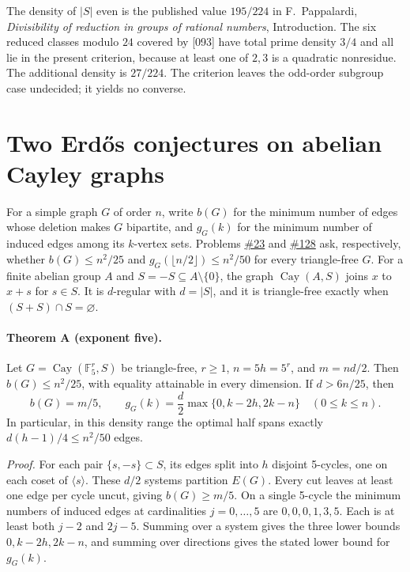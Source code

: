 \documentclass[11pt]{article}
\begin{document}
The density of $|S|$ even is the published value $195/224$ in
F.~Pappalardi, \emph{Divisibility of reduction in groups of rational
numbers}, Introduction. The six reduced classes modulo $24$ covered by
[093] have total prime density $3/4$ and all lie in the present criterion,
because at least one of $2,3$ is a quadratic nonresidue. The additional
density is $27/224$. The criterion leaves the odd-order subgroup case
undecided; it yields no converse.



\section{Two Erd\H{o}s conjectures on abelian Cayley graphs}
For a simple graph $G$ of order $n$, write $b(G)$ for the minimum number of
edges whose deletion makes $G$ bipartite, and $g_G(k)$ for the minimum
number of induced edges among its $k$-vertex sets. Problems
\href{https://www.erdosproblems.com/23}{\#23} and
\href{https://www.erdosproblems.com/128}{\#128} ask, respectively, whether
$b(G)\le n^2/25$ and $g_G(\lfloor n/2\rfloor)\le n^2/50$ for every
triangle-free $G$. For a finite abelian group $A$ and
$S=-S\subseteq A\setminus\{0\}$, the graph $\operatorname{Cay}(A,S)$ joins
$x$ to $x+s$ for $s\in S$. It is $d$-regular with $d=|S|$, and it is
triangle-free exactly when $(S+S)\cap S=\varnothing$.

\paragraph{Theorem A (exponent five).}
Let $G=\operatorname{Cay}(\mathbb F_5^r,S)$ be triangle-free, $r\ge1$,
$n=5h=5^r$, and $m=nd/2$. Then $b(G)\le n^2/25$, with equality attainable
in every dimension. If $d>6n/25$, then
\[
 b(G)=m/5,\qquad
 g_G(k)=\frac d2\max\{0,k-2h,2k-n\}\quad (0\le k\le n).
\]
In particular, in this density range the optimal half spans exactly
$d(h-1)/4\le n^2/50$ edges.

\noindent\emph{Proof.}
For each pair $\{s,-s\}\subset S$, its edges split into $h$ disjoint
5-cycles, one on each coset of $\langle s\rangle$. These $d/2$ systems
partition $E(G)$. Every cut leaves at least one edge per cycle uncut,
giving $b(G)\ge m/5$. On a single 5-cycle the minimum numbers of induced
edges at cardinalities $j=0,\ldots,5$ are $0,0,0,1,3,5$. Each is at least
both $j-2$ and $2j-5$. Summing over a system gives the three lower bounds
$0,k-2h,2k-n$, and summing over directions gives the stated lower bound for
$g_G(k)$.
\end{document}

